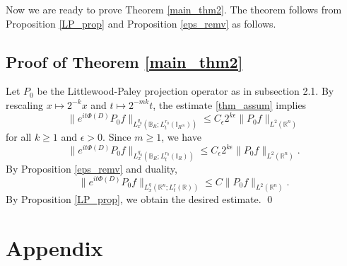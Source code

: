 \documentclass[11pt,reqno]{amsart}
\DeclareMathOperator{\supp}{supp}
\theoremstyle{plain}
\newtheorem{prop}[thm]{Proposition}
\theoremstyle{definition}
\theoremstyle{remark}
\numberwithin{equation}{section}
\begin{document}
%

Now we are ready to prove Theorem \ref{main_thm2}. The theorem follows from Proposition \ref{LP_prop} and Proposition \ref{eps_remv} as follows.

\subsection{Proof of Theorem \ref{main_thm2}}

Let $P_0$ be the Littlewood-Paley projection operator as in subsection 2.1.
By rescaling $x \mapsto 2^{-k}x$ and $t \mapsto 2^{-mk}t$,  the estimate \eqref{thm_assum} implies
    $$
    \| e^{it\Phi(D)} P_0 f\|_{L_x^{q_0}(\mathbb{B}_{R}; L_t^{r_0}(\mathbb{I}_{R^{m}}) )}
    \leq C_{\epsilon} 2^{k\epsilon} \|P_0 f\|_{L^2(\mathbb R^n)}
    $$
for all $k\geq1$ and $\epsilon>0$. 
Since $m\geq 1$, we have
    $$
    \| e^{it\Phi(D)} P_0 f\|_{L_x^{q_0}(\mathbb{B}_{R}; L_t^{r_0}(\mathbb{I}_{R}) )}
    \leq C_{\epsilon} 2^{k\epsilon} \|P_0 f\|_{L^2(\mathbb R^n)} .
    $$
By Proposition \ref{eps_remv} and duality,
    $$
    \| e^{it\Phi(D)} P_0 f\|_{L_x^{q}(\mathbb{R}^n; L_t^{r}(\mathbb{R}) )}
    \leq C\|P_0 f\|_{L^2(\mathbb R^n)}.
    $$
By Proposition \ref{LP_prop}, we obtain the desired estimate. \qed





\section{Appendix} \label{sec:append}
\end{document}
